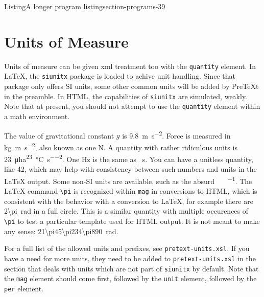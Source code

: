 \documentclass{sn-jnl}
\theoremstyle{thmstyleone}%
\theoremstyle{thmstyletwo}%
\theoremstyle{thmstylethree}%
\newcommand{\mono}[1]{\texttt{#1}}
\numberwithin{equation}{section}
\begin{document}
\begin{listingptx}{Listing}{A longer program listing}{section-programs-39}{}
\tcblower
\end{listingptx}%
%
%
\typeout{************************************************}
\typeout{************************************************}
%
\section{Units of Measure}\label{section-units-measure}%
Units of measure can be given xml treatment too with the \mono{quantity} element. In \LaTeX{}, the \mono{siunitx} package is loaded to achive unit handling. Since that package only offers SI units, some other common units will be added by PreTeXt in the preamble. In HTML, the capabilities of \mono{siunitx} are simulated, weakly. Note that at present, you should not attempt to use the \mono{quantity} element within a math environment.%
\par
The value of gravitational constant \(g\) is \SI{9.8}{\meter\per\second\tothe{2}}. Force is measured in \si{\kilo\gram\meter\per\second\tothe{2}}, also known as one \si{\newton}. A quantity with rather ridiculous units is \SI{23}{\micro\hectare\tothe{23}\per\degreeCelsius\per\second\tothe{2}}. One \si{\hertz} is the same as \si{\per\second}. You can have a unitless quantity, like \num{42}, which may help with consistency between such numbers and units in the \LaTeX{} output. Some non-SI units are available, such as the absurd \si{\degreeFahrenheit\foot\pound\per\gallon}.  The \LaTeX{} command \mono{\textbackslash{}pi} is recognized within \mono{mag} in conversions to HTML, which is consistent with the behavior with a conversion to \LaTeX{}, for example there are \SI{2\pi}{\radian} in a full circle.  This is a similar quantity with multiple occurences of \mono{\textbackslash{}pi} to test a particular template used for HTML output.  It is not meant to make any sense: \SI{21\pi45\pi234\pi890}{\radian}.%
\par
For a full list of the allowed units and prefixes, see \mono{pretext-units.xsl}. If you have a need for more units, they need to be added to \mono{pretext-units.xsl} in the section that deals with units which are not part of \mono{siunitx} by default.  Note that the \mono{mag} element should come first, followed by the \mono{unit} element, followed by the \mono{per} element.%
%
%
\typeout{************************************************}
\typeout{************************************************}
%
\end{document}
